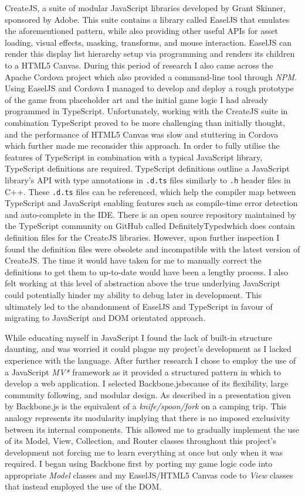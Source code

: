 \documentclass[final]{cmpreport}
\begin{document}
CreateJS, a suite of modular JavaScript libraries developed by Grant Skinner, sponsored by Adobe. This suite contains a library called EaselJS that emulates the aforementioned pattern, while also providing other useful APIs for asset loading, visual effects, masking, transforms, and mouse interaction. EaselJS can render this display list hierarchy setup via programming and renders its children to a HTML5 Canvas. During this period of research I also came across the Apache Cordova project which also provided a command-line tool through \textit{NPM}. Using EaselJS and Cordova I managed to develop and deploy a rough prototype of the game from placeholder art and the initial game logic I had already programmed in TypeScript. Unfortunately, working with the CreateJS suite in combination TypeScript proved to be more challenging than initially thought, and the performance of HTML5 Canvas was slow and stuttering in Cordova which further made me reconsider this approach. In order to fully utilise the features of TypeScript in combination with a typical JavaScript library, TypeScript definitions are required. TypeScript definitions outline a JavaScript library's API with type annotations in \texttt{.d.ts} files similarly to \texttt{.h} header files in C++. These \texttt{.d.ts} files can be referenced, which help the compiler map between TypeScript and JavaScript enabling features such as compile-time error detection and auto-complete in the IDE. There is an open source repository maintained by the TypeScript community on GitHub called DefinitelyTyped\footnotemark which does contain definition files for the CreateJS libraries. However, upon further inspection I found the definition files were obsolete and incompatible with the latest version of CreateJS. The time it would have taken for me to manually correct the definitions to get them to up-to-date would have been a lengthy process. I also felt working at this level of abstraction above the true underlying JavaScript could potentially hinder my ability to debug later in development. This ultimately led to the abandonment of EaselJS and TypeScript in favour of migrating to JavaScript and DOM orientated approach.

While educating myself in JavaScript I found the lack of built-in structure daunting, and was worried it could plague my project's development as I lacked experience with the language. After further research I chose to employ the use of a JavaScript \textit{MV*} framework as it provided a structured pattern in which to develop a web application. I selected Backbone.js\footnotemark because of its flexibility, large community following, and modular design. As described in a presentation given by \citet{Bull} Backbone.js is the equivalent of a \textit{knife/spoon/fork} on a camping trip. This analogy represents its modularity implying that there is no imposed exclusivity between its internal components. This allowed me to gradually implement the use of its Model, View, Collection, and Router classes throughout this project's development not forcing me to learn everything at once but only when it was required. I began using Backbone first by porting my game logic code into appropriate \textit{Model} classes and my EaselJS/HTML5 Canvas code to \textit{View} classes that instead employed the use of the DOM.
\end{document}
